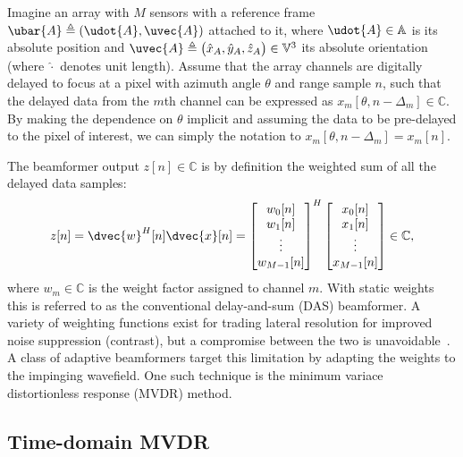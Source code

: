 {Imagine an array with $M$ sensors with a reference frame $\ubar{A} \triangleq (\udot{A},\uvec{A})$ attached to it, where $\udot{A}\in\mathbb{A}$ is its absolute position and $\uvec{A}\triangleq\big(\hat{x}_{A},\hat{y}_{A},\hat{z}_{A}\big)\in\mathbb{V}^3$ its absolute orientation (where $\hat{\cdot}$ denotes unit length). Assume that the array channels are digitally delayed to focus at a pixel with azimuth angle $\theta$ and range sample $n$, such that the delayed data from the $m$th channel can be expressed as $x_m[\theta,n-\Delta_m]\in\mathbb{C}$. By making the dependence on $\theta$ implicit and assuming the data to be pre-delayed to the pixel of interest, we can simply the notation to $x_m[\theta,n-\Delta_m] = x_m[n]$. 

The beamformer output $z[n]\in\mathbb{C}$ is by definition the weighted sum of all the delayed data samples:
%
\begin{align}
z[n] = \dvec{w}^H[n]\dvec{x}[n] = \bmat{w_0[n]\\w_1[n]\\\vdots\\w_{M-1}[n]}^H \bmat{x_0[n]\\x_1[n]\\\vdots\\x_{M-1}[n]} \in\mathbb{C},\label{2_eq_z}
\end{align}
%
where $w_m\in\mathbb{C}$ is the weight factor assigned to channel $m$. With static weights this is referred to as the conventional delay-and-sum (DAS) beamformer. A variety of weighting functions exist for trading lateral resolution for improved noise suppression (contrast), but a compromise between the two is unavoidable~\cite{Harris1978}. A class of adaptive beamformers target this limitation by adapting the weights to the impinging wavefield. One such technique is the minimum variace distortionless response (MVDR) method.





\subsection{Time-domain MVDR}

}
